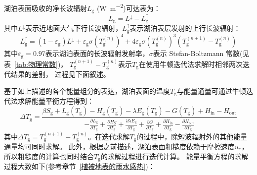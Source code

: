 湖泊表面吸收的净长波辐射$L_{\mathrm {g}} $ (\unit{W.m^{-2}})可达表为：
\begin{equation}
  L_{\mathrm{g}}=L ^\downarrow-L_{\mathrm{g}} ^\uparrow
\end{equation}
其中$L^\downarrow$表示近地面大气下行长波辐射，$L_{\mathrm {g}} ^\uparrow$表示湖泊表层发射的上行长波辐射：
\begin{equation}
  L_{\mathrm{g}} ^\uparrow=\left(1-\varepsilon_{\mathrm{g}}\right) L ^\downarrow+\varepsilon_{\mathrm{g}}
  \sigma\left(T_{\mathrm{g}}^{(n)}\right)^{4}+4 \varepsilon_{\mathrm{g}}
  \sigma\left(T_{\mathrm{g}}^{(n)}\right)^{3}\left(T_{\mathrm{g}}^{(n+1)}-T_{\mathrm{g}}^{(n)}\right)
\end{equation}
其中$\varepsilon_{\mathrm {g}} =0.97$表示湖泊表面的长波辐射发射率，$\sigma$表示 Stefan-Boltzmann 常数(见表~\ref{tab:物理常数})，
$T_{\mathrm {g}} ^{\left(n+1\right)}-T_{\mathrm {g}} ^{\left(n\right)}$表示$T_{\mathrm {g}} $在使用牛顿迭代法求解时相邻两次迭代结果的差别，
过程见下面叙述。


基于如上描述的各个能量组分的表达，湖泊表面的温度$T_{\mathrm {g}} $与能量通量可通过牛顿迭代法求解能量平衡方程得到：
\begin{equation}
  \Delta T_{\mathrm{g}}=\frac{\beta S_{\mathrm{g}}+L_{\mathrm{g}}\left(T_{\mathrm{g}}\right)-H_{\mathrm{g}}\left(T_{\mathrm{g}}\right)
  -\lambda E_{\mathrm{g}}\left(T_{\mathrm{g}}\right)-G\left(T_{\mathrm{g}}\right)+H_{\mathrm{in}}-H_{\mathrm{out}}}{-\frac{\partial L_{\mathrm{g}}}{\partial T_{\mathrm{g}}}
  +\frac{\partial H g}{\partial T_{\mathrm{g}}}+\frac{\partial \lambda E_{\mathrm{g}}}{\partial T_{\mathrm{g}}}+\frac{\partial G}{\partial T_{\mathrm{g}}}+\frac{\partial H_{\mathrm{in}}}{\partial T_{\mathrm{g}}}-\frac{\partial H_{\mathrm{out}}}{\partial T_{\mathrm{g}}}}
\end{equation}
其中$\Delta T_{\mathrm {g}} =T_{\mathrm {g}} ^{\left(n+1\right)}-T_{\mathrm {g}} ^{\left(n\right)}$。在迭代求解$T_{\mathrm {g}} $的过程中，除短波辐射外的其他能量通量均可同时求解。
此外，根据之前描述，湖泊表面粗糙度依赖于摩擦速度$u_\ast$，所以粗糙度的计算也同时结合$T_{\mathrm {g}} $的求解过程进行迭代计算。
能量平衡方程的求解过程大致如下(参考章节~\ref{植被地表的雨水感热})：

